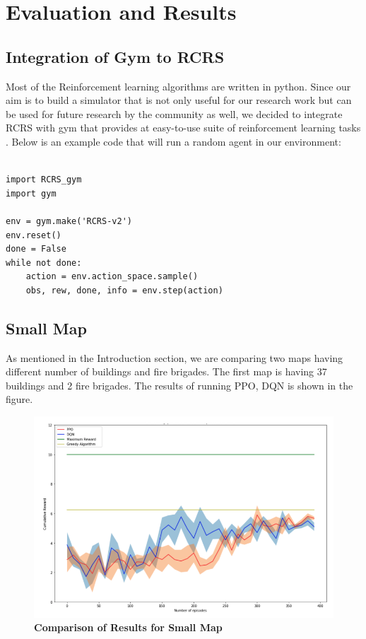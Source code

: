 \documentclass[12pt]{report}
\begin{document}
\chapter{Evaluation and Results}
\section{Integration of Gym to RCRS}

Most of the Reinforcement learning algorithms are written in python. Since our aim is to build a simulator that is not only useful for our research work but can be used for future research by the community as well, we decided to integrate RCRS with gym that provides at easy-to-use suite of reinforcement learning tasks \cite{brockman2016openai}. Below is an example code that will run a random agent in our environment:
\begin{lstlisting}

import RCRS_gym
import gym

env = gym.make('RCRS-v2')
env.reset()
done = False
while not done:
    action = env.action_space.sample()
    obs, rew, done, info = env.step(action)

\end{lstlisting}

\section{Small Map}

As mentioned in the Introduction section, we are comparing two maps having different number of buildings and fire brigades. The first map is having 37 buildings and 2 fire brigades. The results of running PPO, DQN is shown in the figure. 

\begin{figure}[!h]
    \centering
    \includegraphics[width=12cm]{29.png}
    \caption{\textbf{Comparison of Results for Small Map}}
    \label{fig:x}
\end{figure}
\end{document}
